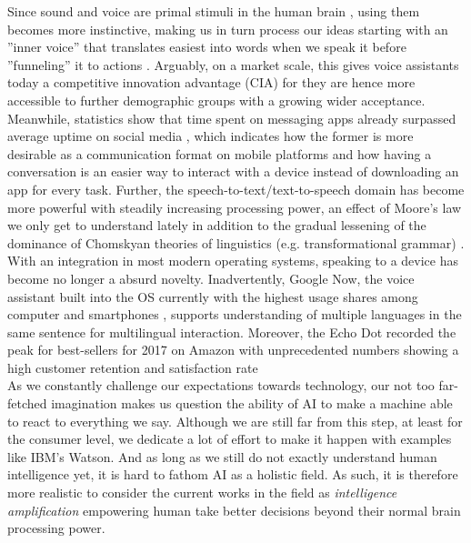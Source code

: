 Since sound and voice are primal stimuli in the human brain \cite{voiceneurons}, using them becomes more instinctive, making us in turn process our ideas starting with an ''inner voice'' that translates easiest into words when we speak it before ''funneling'' it to actions \cite{alexapc18}.
Arguably, on a market scale, this gives voice assistants today a competitive innovation advantage (CIA) for they are hence more accessible to further demographic groups with a growing wider acceptance.\\

Meanwhile, statistics \cite{businsider} show that time spent on messaging apps already surpassed average uptime on social media , which indicates how the former is more desirable as a communication format on mobile platforms and how having a conversation is an easier way to interact with a device instead of downloading an app for every task. 
Further, the speech-to-text/text-to-speech domain has become more powerful with steadily increasing processing power, an effect of Moore's law we only get to understand lately in addition to the gradual lessening of the dominance of Chomskyan theories of linguistics (e.g. transformational grammar) \cite{wiki:nlp}.
With an integration in most modern operating systems, speaking to a device has become no longer a absurd novelty. 
Inadvertently, Google Now, the voice assistant built into the OS currently with the highest usage shares among computer and smartphones \cite{wiki:gartnerreports}, supports understanding of multiple languages in the same sentence for multilingual interaction.
Moreover, the Echo Dot recorded the peak for best-sellers for 2017 on Amazon with unprecedented numbers showing a high customer retention and satisfaction rate \cite{cnbcAlexa}\\

As we constantly challenge our expectations towards technology, our not too far-fetched imagination makes us question the ability of AI to make a machine able to react to everything we say.
Although we are still far from this step, at least for the consumer level, we dedicate a lot of effort to make it happen with examples like IBM's Watson.
And as long as we still do not exactly understand human intelligence yet, it is hard to fathom AI as a holistic field. As such, it is therefore more realistic to consider the current works in the field as \textit{intelligence amplification} \cite{alexapc18} empowering human take better decisions beyond their normal brain processing power.
\\

